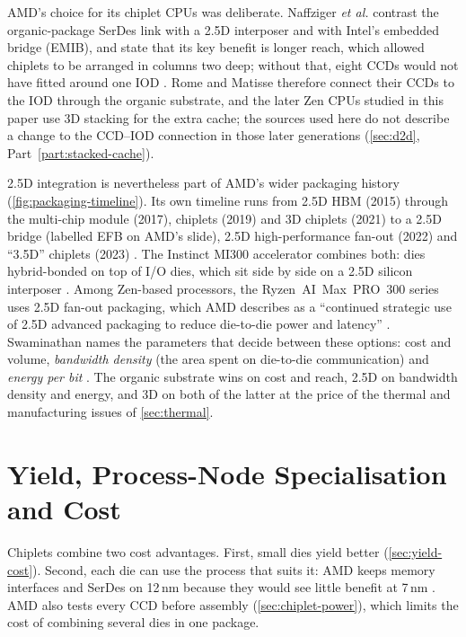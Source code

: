 AMD's choice for its chiplet CPUs was deliberate. Naffziger \emph{et al.} contrast the organic-package SerDes link with a 2.5D interposer and with Intel's embedded bridge (EMIB), and state that its key benefit is longer reach, which allowed chiplets to be arranged in columns two deep; without that, eight CCDs would not have fitted around one IOD \cite{naffziger2020chiplet}. Rome and Matisse therefore connect their CCDs to the IOD through the organic substrate, and the later Zen CPUs studied in this paper use 3D stacking for the extra cache; the sources used here do not describe a change to the CCD--IOD connection in those later generations (\cref{sec:d2d}, Part~\ref{part:stacked-cache}).



2.5D integration is nevertheless part of AMD's wider packaging history (\cref{fig:packaging-timeline}). Its own timeline runs from 2.5D HBM (2015) through the multi-chip module (2017), chiplets (2019) and 3D chiplets (2021) to a 2.5D bridge (labelled EFB on AMD's slide), 2.5D high-performance fan-out (2022) and ``3.5D'' chiplets (2023) \cite[slide~5]{lambertHeterogenousIntegrationHigh2025}. The Instinct MI300 accelerator combines both: dies hybrid-bonded on top of I/O dies, which sit side by side on a 2.5D silicon interposer \cite[slide~10]{lambertHeterogenousIntegrationHigh2025}. Among Zen-based processors, the Ryzen~AI~Max~PRO~300 series uses 2.5D fan-out packaging, which AMD describes as a ``continued strategic use of 2.5D advanced packaging to reduce die-to-die power and latency'' \cite[slide~8]{lambertHeterogenousIntegrationHigh2025}. Swaminathan names the parameters that decide between these options: cost and volume, \emph{bandwidth density} (the area spent on die-to-die communication) and \emph{energy per bit} \cite[slide~7]{swaminathanAdvancedPackagingEnabling2021}. The organic substrate wins on cost and reach, 2.5D on bandwidth density and energy, and 3D on both of the latter at the price of the thermal and manufacturing issues of \cref{sec:thermal}.

\section{Yield, Process-Node Specialisation and Cost}
\label{sec:process-specialisation}

Chiplets combine two cost advantages. First, small dies yield better (\cref{sec:yield-cost}). Second, each die can use the process that suits it: AMD keeps memory interfaces and SerDes on 12\,nm because they would see little benefit at 7\,nm \cite{naffziger2020chiplet}. AMD also tests every CCD before assembly (\cref{sec:chiplet-power}), which limits the cost of combining several dies in one package.

